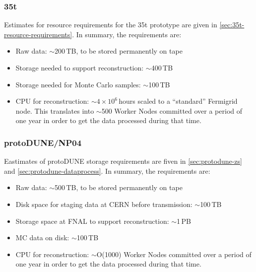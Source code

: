 \subsubsection{35t}
Estimates for resource requirements for the 35t prototype are given in \ref{sec:35t-resource-requirements}.
In summary, the requirements are:
\begin{itemize}

\item Raw data: $\sim$200\,TB, to be stored permanently on tape

\item Storage needed to support reconstruction: $\sim$400\,TB


\item Storage needed for Monte Carlo samples: $\sim$100\,TB

\item CPU for reconstruction: $\sim4\times10^6$\,hours scaled to a ``standard'' Fermigrid node. This translates into $\sim$500 Worker Nodes
committed over a period of one year in order to get the data processed during that time.

\end{itemize}

\subsubsection{protoDUNE/NP04}
Eastimates of protoDUNE storage requirements are fiven in \ref{sec:protodune-zs} and \ref{sec:protodune-dataprocess}.
In summary, the requirements are:
\begin{itemize}

\item Raw data: $\sim$500\,TB, to be stored permanently on tape


\item Disk space for staging data at CERN before transmission: $\sim$100\,TB

\item Storage space at FNAL to support reconstruction: $\sim$1\,PB

\item MC data on disk: $\sim$100\,TB

\item CPU for reconstruction: $\sim$O(1000) Worker Nodes
committed over a period of one year in order to get the data processed during that time.

\end{itemize}

